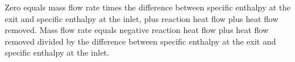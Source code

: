 Zero equals mass flow rate times the difference between specific enthalpy at the exit and specific enthalpy at the inlet, plus reaction heat flow plus heat flow removed.  
Mass flow rate equals negative reaction heat flow plus heat flow removed divided by the difference between specific enthalpy at the exit and specific enthalpy at the inlet.